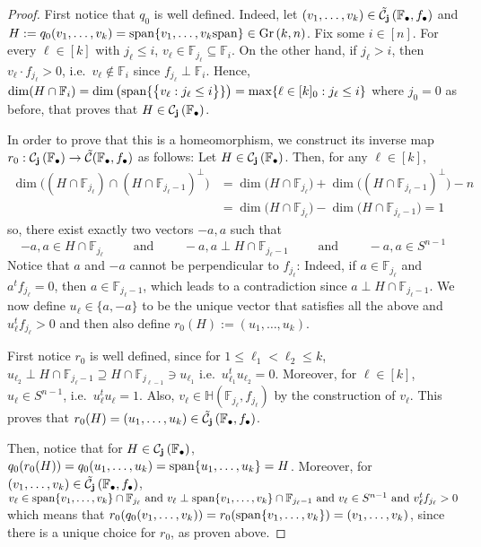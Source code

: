 \begin{proof} First notice that $q_0$ is well defined. Indeed, let $(v_1,\ldots,v_k)\in\tilde{\mathcal{C}}_{\mathbf{j}}\left(\mathbb{F}_{\bullet},f_{\bullet}\right)$ and
$H:=q_0(v_1,\ldots,v_k)=\spans\{v_1,\ldots,v_k\spans\}\in\Gr{k}{n}$.
Fix some $i\in[n]$. For every $\ell\in[k]$ with $j_{\ell}\leq i$,  $v_{\ell}\in\mathbb{F}_{j_{\ell}}\subseteq\mathbb{F}_i$. On the other hand, if $j_{\ell}>i$, then $v_{\ell}\cdot f_{j_{\ell}}>0$, i.e.\ $v_{\ell}\not\in\mathbb{F}_i$ since $f_{j_{\ell}}\perp\mathbb{F}_i$. Hence,
$\dim(H\cap\mathbb{F}_i)=\dim\left(\mathrm{span}\{\big\{v_{\ell}:j_{\ell}\leq i\big\}\}\right)=\max\{\ell\in[k]_0:j_{\ell}\leq i\}$
where $j_0=0$ as before, that proves that $H\in\mathcal{C}_{\mathbf{j}}\left(\mathbb{F}_{\bullet}\right)$.

In order to prove that this is a homeomorphism, we construct its inverse map $r_0:\mathcal{C}_{\mathbf{j}}\left(\mathbb{F}_{\bullet}\right)\to\tilde{\mathcal{C}}(\mathbb{F}_{\bullet},f_{\bullet})$ as follows: Let $H\in\mathcal{C}_{\mathbf{j}}\left(\mathbb{F}_{\bullet}\right)$. Then, for any $\ell\in[k]$,
\begin{align*}
\dim\big(\left(H\cap\mathbb{F}_{j_{\ell}}\right)\cap\left(H\cap\mathbb{F}_{j_{\ell}-1}\right)^{\perp}\big)&=\dim\big(H\cap\mathbb{F}_{j_{\ell}}\big)+\dim\big(\left(H\cap\mathbb{F}_{j_{\ell}-1}\right)^{\perp}\big)-n\\
&=\dim\big(H\cap\mathbb{F}_{j_{\ell}}\big)-\dim\big(H\cap\mathbb{F}_{j_{\ell}-1}\big)=1
\end{align*}
so, there exist exactly two vectors $-a,a$ such that
\[-a,a\in H\cap\mathbb{F}_{j_{\ell}}\qquad\text{ and }\qquad-a,a\perp H\cap\mathbb{F}_{j_{\ell}-1}\qquad\text{ and }\qquad-a,a\in S^{n-1}\]
Notice that $a$ and $-a$ cannot be perpendicular to $f_{j_{\ell}}$: Indeed, if $a\in\mathbb{F}_{j_{\ell}}$ and $a^tf_{j_{\ell}}=0$, then $a\in\mathbb{F}_{j_{\ell}-1}$, which leads to a contradiction since $a\perp H\cap\mathbb{F}_{j_{\ell}-1}$. We now define $u_{\ell}\in\{a,-a\}$ to be the unique vector that satisfies all the above and $u_{\ell}^tf_{j_{\ell}}>0$ and then also define $r_0(H):=(u_1,\ldots,u_k)$.

First notice $r_0$ is well defined, since for $1\leq\ell_1<\ell_2\leq k$,
$u_{\ell_2}\perp H\cap\mathbb{F}_{j_{\ell}-1}\supseteq H\cap\mathbb{F}_{j_{\ell-1}}\ni u_{\ell_1}$
i.e.\ $u_{\ell_1}^tu_{\ell_2}=0$. Moreover, for $\ell\in[k]$, $u_{\ell}\in S^{n-1}$, i.e.\ $u_{\ell}^tu_{\ell}=1$. Also, $v_{\ell}\in\mathbb{H}(\mathbb{F}_{j_{\ell}},f_{j_{\ell}})$ by the construction of $v_{\ell}$. This proves that $r_0(H)=(u_1,\ldots,u_k)\in\tilde{\mathcal{C}}_{\mathbf{j}}\left(\mathbb{F}_{\bullet},f_{\bullet}\right)$.

Then, notice that for $H\in\mathcal{C}_{\mathbf{j}}\left(\mathbb{F}_{\bullet}\right)$,
$q_0(r_0(H))=q_0(u_1,\ldots,u_k)=\mathrm{span}\{u_1,\ldots,u_k\}=H$.
Moreover, for $(v_1,\ldots,v_k)\in\tilde{\mathcal{C}}_{\mathbf{j}}\left(\mathbb{F}_{\bullet},f_{\bullet}\right)$,
$v_{\ell}\in\mathrm{span}\{v_1,\ldots,v_k\}\cap\mathbb{F}_{j_{\ell}}\text{ and } v_{\ell}\perp\mathrm{span}\{v_1,\ldots,v_k\}\cap\mathbb{F}_{j_{\ell}-1}\text{ and }v_{\ell}\in S^{n-1}\text{ and }v_{\ell}^tf_{j_{\ell}}>0$
which means that
$r_0(q_0(v_1,\ldots,v_k))=r_0(\mathrm{span}\{v_1,\ldots,v_k\})=(v_1,\ldots,v_k)$,
since there is a unique choice for $r_0$, as proven above.
\end{proof}

